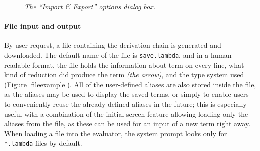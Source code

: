 \documentclass[table, a4paper, 10pt]{book}
\begin{document}
\begin{figure}[H]\centering
{}
\caption{\textit{The ``Import \& Export'' options dialog box.}}\label{iowindow}
\end{figure}

\paragraph{File input and output}
By user request, a file containing the derivation chain is generated and
downloaded. The default name of the file is \texttt{save.lambda}, and in a human-readable
format, the file holds the information about term on every line, what kind of reduction
did produce the term \textit{(the arrow)}, and the type system used (Figure \ref{fileexample}).
All of the user-defined aliases are also stored inside the file,
as the aliases may be used to display the saved terms, or simply to
enable users to conveniently reuse the already defined aliases in the future;
this is especially useful with a combination of the initial screen feature
allowing loading only the aliases from the file, as these can be used for an input
of a new term right away. When loading a file into the evaluator, the
system prompt looks only for \texttt{*.lambda} files by default.
\end{document}
